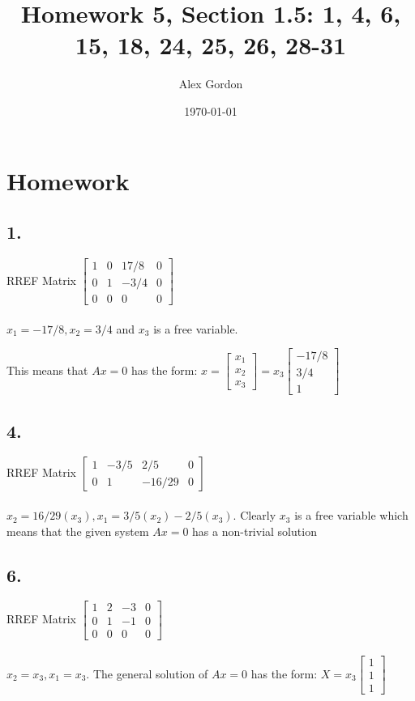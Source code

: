 \documentclass[12]{scrartcl}
\begin{document}
\title{Homework 5, Section 1.5: 1, 4, 6, 15, 18, 24, 25, 26, 28-31 }
\author{Alex Gordon}
\date{\today}
\maketitle
\section*{Homework}
\subsection*{1.}
RREF Matrix
$\begin{bmatrix} 1& 0& 17/8& 0 \\ 0& 1& -3/4& 0 \\ 0 & 0 & 0 & 0  \end{bmatrix}$
\\
\\
$x_1 = -17/8, x_2 = 3/4$ and $x_3$ is a free variable. 

This means that $Ax = 0$ has the form:
$x = \begin{bmatrix} x_1 \\ x_2\\  x_3  \end{bmatrix} = x_3\begin{bmatrix} -17/8 \\ 3/4\\  1  \end{bmatrix}$


\subsection*{4.}
RREF Matrix
$\begin{bmatrix} 1& -3/5& 2/5& 0 \\ 0& 1& -16/29& 0  \end{bmatrix}$
\\
\\
$x_2 = 16/29 (x_3), x_1 = 3/5(x_2)-2/5(x_3)$. Clearly $x_3$ is a free variable which means that the given system $Ax = 0$ has a non-trivial solution

\subsection*{6.}
RREF Matrix
$\begin{bmatrix} 1& 2& -3& 0 \\ 0& 1& -1& 0 \\ 0&0&0&0 \end{bmatrix}$
\\
\\
$x_2 = x_3, x_1 = x_3$. The general solution of $Ax = 0$ has the form:
$X = x_3\begin{bmatrix} 1\\ 1\\  1  \end{bmatrix}$
\end{document}
